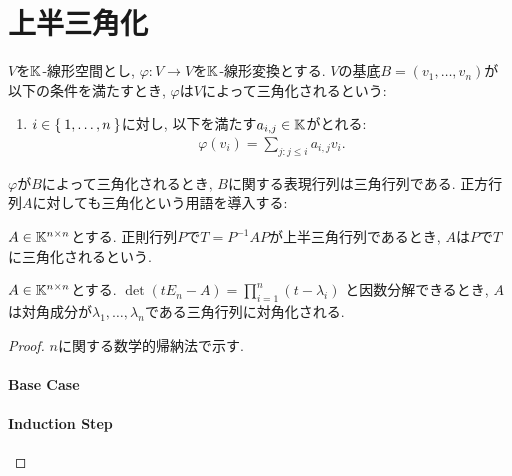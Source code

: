 \section{上半三角化}

\begin{definition}
$V$を$\mathbb{K}$-線形空間とし,
$\varphi\colon V\to V$を$\mathbb{K}$-線形変換とする.
$V$の基底$B=(v_1,\ldots,v_n)$が以下の条件を満たすとき,
$\varphi$は$V$によって三角化されるという:
\begin{enumerate}
\item
$i\in\Set{1,\ldots,n}$に対し,
以下を満たす$a_{i,j}\in\mathbb{K}$がとれる:
\begin{align*}
\varphi(v_i)=\sum_{j\colon j\leq i }a_{i,j}v_i.
\end{align*}
\end{enumerate}
\end{definition}
$\varphi$が$B$によって三角化されるとき,
$B$に関する表現行列は三角行列である.
正方行列$A$に対しても三角化という用語を導入する:
\begin{definition}
$A\in \mathbb{K}^{n\times n}$とする.
正則行列$P$で$T=P^{-1}AP$が上半三角行列であるとき,
$A$は$P$で$T$に三角化されるという.
\end{definition}

\begin{prop}
$A\in \mathbb{K}^{n\times n}$とする.
$\det(tE_n-A)=\prod_{i=1}^n (t-\lambda_i)$
と因数分解できるとき,
$A$は対角成分が$\lambda_1,\ldots,\lambda_n$である三角行列に対角化される.
\end{prop}
\begin{proof}
$n$に関する数学的帰納法で示す.
\paragraph{Base Case}
\paragraph{Induction Step}
\end{proof}

